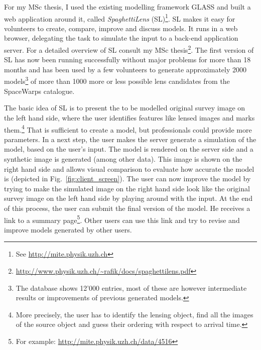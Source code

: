\documentclass[11pt]{article}
\begin{document}
For my MSc thesis\cite{mscth}, I used the existing modelling framework GLASS\cite{glass2, glass} and built a web application around it, called \emph{SpaghettiLens} (SL)\footnote{See \url{http://mite.physik.uzh.ch}}.
SL makes it easy for volunteers to create, compare, improve and discuss models.
It runs in a web browser, delegating the task to simulate the input to a back-end application server.
For a detailed overview of SL consult my MSc thesis\footnote{\url{http://www.physik.uzh.ch/~rafik/docs/spaghettilens.pdf}}.
The first version of SL has now been running successfully without major problems for more than 18 months and has been used by a few volunteers to generate approximately 2000 models\footnote{The database shows 12'000 entries, most of these are however intermediate results or improvements of previous generated models.} of more than 1000 more or less possible lens candidates from the SpaceWarps catalogue.


The basic idea of SL is to present the to be modelled original survey image on the left hand side, where the user identifies features like lensed images and marks them.\footnote{More precisely, the user has to identify the lensing object, find all the images of the source object and guess their ordering with respect to arrival time.}
That is sufficient to create a model, but professionals could provide more parameters.
In a next step, the user makes the server generate a simulation of the model, based on the user's input.
The model is rendered on the server side and a synthetic image is generated (among other data).
This image is shown on the right hand side and allows visual comparison to evaluate how accurate the model is (depicted in Fig.~\ref{fig:client_screen}).
The user can now improve the model by trying to make the simulated image on the right hand side look like the original survey image on the left hand side by playing around with the input.
At the end of this process, the user can submit the final version of the model.
He receives a link to a summary page\footnote{For example: \url{http://mite.physik.uzh.ch/data/4516}}.
Other users can use this link and try to revise and improve models generated by other users.
\end{document}

